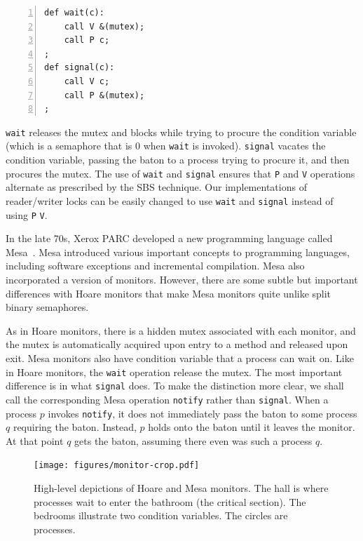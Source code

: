 \documentclass{report}
\newenvironment{code}{
\tcolorbox
}{
\endtcolorbox
}
\begin{document}
\begin{code} 
\begin{Verbatim}[xleftmargin=5mm,numbers=left]
def wait(c):
    call V &(mutex);
    call P c;
;
def signal(c):
    call V c;
    call P &(mutex);
;
\end{Verbatim} 
\end{code} 

\texttt{wait} releases the mutex and blocks while trying
to procure the condition variable (which is a semaphore that is 0 when
\texttt{wait} is invoked).
\texttt{signal} vacates the condition variable, passing the baton to
a process trying to procure it, and then procures the mutex.
The use of \texttt{wait} and \texttt{signal} ensures that \texttt{P} and
\texttt{V} operations alternate as prescribed by the SBS technique.
Our implementations of reader/writer locks can be easily changed to
use \texttt{wait} and \texttt{signal} instead of using \texttt{P}
\texttt{V}.

In the late 70s, Xerox PARC developed a new programming language called
Mesa~\cite{LR80}.
Mesa introduced various important concepts to programming languages,
including software exceptions and incremental compilation.  Mesa also
incorporated a version of monitors.
However, there are some subtle but important differences with Hoare
monitors that make Mesa monitors quite unlike split binary semaphores.

As in Hoare monitors, there is a hidden mutex associated with each monitor,
and the mutex is automatically acquired upon entry to a method and released
upon exit.
Mesa monitors also have condition variable that a process can wait on.
Like in Hoare monitors, the \texttt{wait} operation release the mutex.
The most important difference is in what \texttt{signal} does.
To make the distinction more clear, we shall call the corresponding Mesa
operation \texttt{notify} rather than \texttt{signal}.
When a process $p$ invokes \texttt{notify}, it does not immediately pass 
the baton to some process $q$ requiring the baton.  Instead, $p$ holds onto
the baton until it leaves the monitor.  At that point $q$ gets the baton,
assuming there even was such a process $q$.

\begin{figure}
\begin{center}
\texttt{[image: figures/monitor-crop.pdf]}
\end{center}
\caption{High-level depictions of Hoare and Mesa monitors.  The hall is
where processes wait to enter the bathroom (the critical section).  The
bedrooms illustrate two condition variables.  The circles are processes.}
\label{fig:monitors}
\end{figure}
\end{document}
